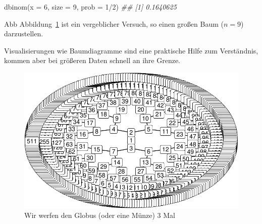 \documentclass[
  a4paper,
  DIV=11]{scrreprt}
\newenvironment{Shaded}{\begin{snugshade}}{\end{snugshade}}
\newcommand{\AttributeTok}[1]{\textcolor[rgb]{0.40,0.45,0.13}{#1}}
\newcommand{\DecValTok}[1]{\textcolor[rgb]{0.68,0.00,0.00}{#1}}
\newcommand{\DocumentationTok}[1]{\textcolor[rgb]{0.37,0.37,0.37}{\textit{#1}}}
\newcommand{\FunctionTok}[1]{\textcolor[rgb]{0.28,0.35,0.67}{#1}}
\newcommand{\NormalTok}[1]{\textcolor[rgb]{0.00,0.23,0.31}{#1}}
\newcommand{\SpecialCharTok}[1]{\textcolor[rgb]{0.37,0.37,0.37}{#1}}
\theoremstyle{definition}
\theoremstyle{remark}
\begin{document}
\begin{Shaded}
\begin{Highlighting}[]
\FunctionTok{dbinom}\NormalTok{(}\AttributeTok{x =} \DecValTok{6}\NormalTok{, }\AttributeTok{size =} \DecValTok{9}\NormalTok{, }\AttributeTok{prob =} \DecValTok{1}\SpecialCharTok{/}\DecValTok{2}\NormalTok{)}
\DocumentationTok{\#\# [1] 0.1640625}
\end{Highlighting}
\end{Shaded}

Abb Abbildung~\ref{fig-binom2} ist ein vergeblicher Versuch, so einen
großen Baum (\(n=9\)) darzustellen.

\begin{tcolorbox}[enhanced jigsaw, title=\textcolor{quarto-callout-note-color}{\faInfo}\hspace{0.5em}{Hinweis}, bottomtitle=1mm, bottomrule=.15mm, titlerule=0mm, colbacktitle=quarto-callout-note-color!10!white, colframe=quarto-callout-note-color-frame, leftrule=.75mm, left=2mm, toprule=.15mm, colback=white, arc=.35mm, breakable, toptitle=1mm, opacityback=0, rightrule=.15mm, coltitle=black, opacitybacktitle=0.6]

Visualisierungen wie Baumdiagramme sind eine praktische Hilfe zum
Verständnis, kommen aber bei größeren Daten schnell an ihre Grenze.

\end{tcolorbox}

\begin{figure}

{\centering \includegraphics{./Globusversuch_files/figure-pdf/fig-binom2-1.pdf}

}

\caption{\label{fig-binom2}Wir werfen den Globus (oder eine Münze) 3
Mal}

\end{figure}
\end{document}
